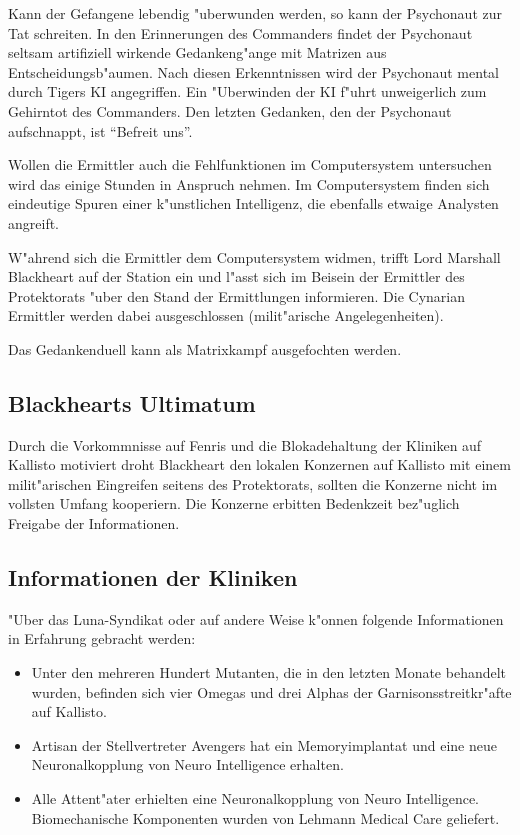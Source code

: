 Kann der Gefangene lebendig "uberwunden werden, so kann der Psychonaut zur Tat schreiten. In den Erinnerungen des Commanders findet der Psychonaut seltsam artifiziell wirkende Gedankeng"ange mit Matrizen aus Entscheidungsb"aumen. Nach diesen Erkenntnissen wird der Psychonaut mental durch Tigers KI angegriffen. Ein "Uberwinden der KI f"uhrt unweigerlich zum Gehirntot des Commanders. Den letzten Gedanken, den der Psychonaut aufschnappt, ist "`Befreit uns"'.

Wollen die Ermittler auch die Fehlfunktionen im Computersystem untersuchen wird das einige Stunden in Anspruch nehmen. Im Computersystem finden sich eindeutige Spuren einer k"unstlichen Intelligenz, die ebenfalls etwaige Analysten angreift.

W"ahrend sich die Ermittler dem Computersystem widmen, trifft Lord Marshall Blackheart auf der Station ein und l"asst sich im Beisein der Ermittler des Protektorats "uber den Stand der Ermittlungen informieren. Die Cynarian Ermittler werden dabei ausgeschlossen (milit"arische Angelegenheiten).

\begin{remarks}
	Das Gedankenduell kann als Matrixkampf ausgefochten werden.
\end{remarks}

\subsection{Blackhearts Ultimatum}

Durch die Vorkommnisse auf Fenris und die Blokadehaltung der Kliniken auf Kallisto motiviert droht Blackheart den lokalen Konzernen auf Kallisto mit einem milit"arischen Eingreifen seitens des Protektorats, sollten die Konzerne nicht im vollsten Umfang kooperiern. Die Konzerne erbitten Bedenkzeit bez"uglich Freigabe der Informationen.

\subsection{Informationen der Kliniken}

"Uber das Luna-Syndikat oder auf andere Weise k"onnen folgende Informationen in Erfahrung gebracht werden:

\begin{itemize}
	\item Unter den mehreren Hundert Mutanten, die in den letzten Monate behandelt wurden, befinden sich vier Omegas und drei Alphas der Garnisonsstreitkr"afte auf Kallisto.
	\item Artisan der Stellvertreter Avengers hat ein Memoryimplantat und eine neue Neuronalkopplung von Neuro Intelligence erhalten.
	\item Alle Attent"ater erhielten eine Neuronalkopplung von Neuro Intelligence. Biomechanische Komponenten wurden von Lehmann Medical Care geliefert.
\end{itemize}

